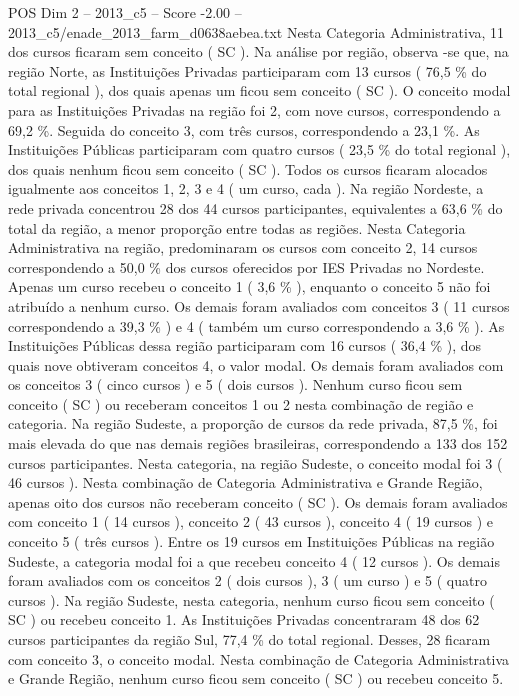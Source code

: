 \begin{textsample}{POS Dim 2 – 2013\_c5 – Score -2.00 – 2013\_c5/enade\_2013\_farm\_d0638aebea.txt}
Nesta Categoria Administrativa, 11 dos cursos ficaram sem conceito ( SC ).
Na análise por região, observa -se que, na região Norte, as Instituições Privadas participaram com 13 cursos ( 76,5 \% do total regional ), dos quais apenas um ficou sem conceito ( SC ).
O conceito modal para as Instituições Privadas na região foi 2, com nove cursos, correspondendo a 69,2 \%.
Seguida do conceito 3, com três cursos, correspondendo a 23,1 \%.
As Instituições Públicas participaram com quatro cursos ( 23,5 \% do total regional ), dos quais nenhum ficou sem conceito ( SC ).
Todos os cursos ficaram alocados igualmente aos conceitos 1, 2, 3 e 4 ( um curso, cada ).
Na região Nordeste, a rede privada concentrou 28 dos 44 cursos participantes, equivalentes a 63,6 \% do total da região, a menor proporção entre todas as regiões.
Nesta Categoria Administrativa na região, predominaram os cursos com conceito 2, 14 cursos correspondendo a 50,0 \% dos cursos oferecidos por IES Privadas no Nordeste.
Apenas um curso recebeu o conceito 1 ( 3,6 \% ), enquanto o conceito 5 não foi atribuído a nenhum curso.
Os demais foram avaliados com conceitos 3 ( 11 cursos correspondendo a 39,3 \% ) e 4 ( também um curso correspondendo a 3,6 \% ).
As Instituições Públicas dessa região participaram com 16 cursos ( 36,4 \% ), dos quais nove obtiveram conceitos 4, o valor modal.
Os demais foram avaliados com os conceitos 3 ( cinco cursos ) e 5 ( dois cursos ).
Nenhum curso ficou sem conceito ( SC ) ou receberam conceitos 1 ou 2 nesta combinação de região e categoria.
Na região Sudeste, a proporção de cursos da rede privada, 87,5 \%, foi mais elevada do que nas demais regiões brasileiras, correspondendo a 133 dos 152 cursos participantes.
Nesta categoria, na região Sudeste, o conceito modal foi 3 ( 46 cursos ).
Nesta combinação de Categoria Administrativa e Grande Região, apenas oito dos cursos não receberam conceito ( SC ).
Os demais foram avaliados com conceito 1 ( 14 cursos ), conceito 2 ( 43 cursos ), conceito 4 ( 19 cursos ) e conceito 5 ( três cursos ).
Entre os 19 cursos em Instituições Públicas na região Sudeste, a categoria modal foi a que recebeu conceito 4 ( 12 cursos ).
Os demais foram avaliados com os conceitos 2 ( dois cursos ), 3 ( um curso ) e 5 ( quatro cursos ).
Na região Sudeste, nesta categoria, nenhum curso ficou sem conceito ( SC ) ou recebeu conceito 1.
As Instituições Privadas concentraram 48 dos 62 cursos participantes da região Sul, 77,4 \% do total regional.
Desses, 28 ficaram com conceito 3, o conceito modal.
Nesta combinação de Categoria Administrativa e Grande Região, nenhum curso ficou sem conceito ( SC ) ou recebeu conceito 5.

\end{textsample}
